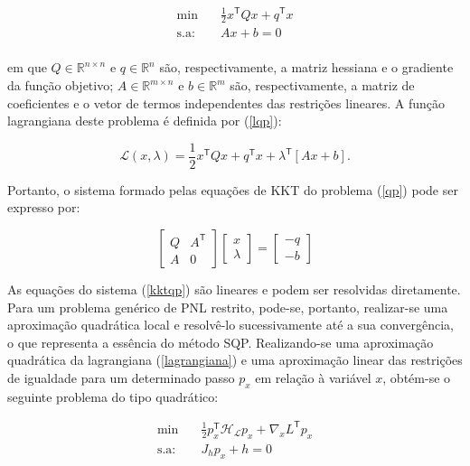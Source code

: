 \documentclass[
	12pt,				%
	openany,			%
	twoside,			%
	a4paper,			%
	chapter=TITLE,		%
	section=Title,		%
	subsection=Title,	%
	subsubsection=Title,%
	english,			%
	french,				%
	spanish,			%
	brazil			%
	]{abntex2}
\begin{document}
\begin{ERRATA}
\begin{equation} \label{qp}
\begin{aligned}
\text{min}  & \quad \frac{1}{2}x^\mathsf{T}Qx + q^\mathsf{T}x \\
\text{s.a:} &\quad   Ax+b=0\\
\end{aligned}
\end{equation}

\noindent em que $Q \in \mathbb{R}^{n \times n}$ e $q \in \mathbb{R}^n$ são, respectivamente, a matriz hessiana e o gradiente da função objetivo; $A \in \mathbb{R}^{m\times n}$  e $b \in \mathbb{R}^{m}$ são, respectivamente, a matriz de coeficientes e o vetor de termos independentes das restrições lineares. A função lagrangiana deste problema é definida por (\ref{lqp}):

\begin{equation} \label{lqp}
\mathcal{L}(x,\lambda) = \frac{1}{2}x^\mathsf{T}Qx + q^\mathsf{T}x + \lambda^\mathsf{T} [Ax+b].
\end{equation}

Portanto, o sistema formado pelas equações de KKT do problema (\ref{qp}) pode ser expresso por:

\begin{equation} \label{kktqp}
\begin{bmatrix}
Q & A^\mathsf{T}\\
A & 0 
\end{bmatrix}
\begin{bmatrix}
x\\
\lambda
\end{bmatrix}
=
\begin{bmatrix}
-q\\
-b
\end{bmatrix}
\end{equation}

As equações do sistema (\ref{kktqp}) são lineares e podem ser resolvidas diretamente. Para um problema genérico de PNL restrito, pode-se, portanto, realizar-se uma aproximação quadrática local e resolvê-lo sucessivamente até a sua convergência, o que representa a essência do método SQP. Realizando-se uma aproximação quadrática da lagrangiana (\ref{lagrangiana}) e uma aproximação linear das restrições de igualdade para um determinado passo $p_x$ em relação à variável $x$, obtém-se o seguinte problema do tipo quadrático:


\begin{equation} \label{qpap}
\begin{aligned}
\text{min}  & \quad \frac{1}{2}p_x^\mathsf{T}\mathcal{H_L}p_x + \nabla_xL^\mathsf{T}p_x \\
\text{s.a:} &\quad   J_hp_x+h=0\\
\end{aligned}
\end{equation}


\end{ERRATA}
\end{document}
